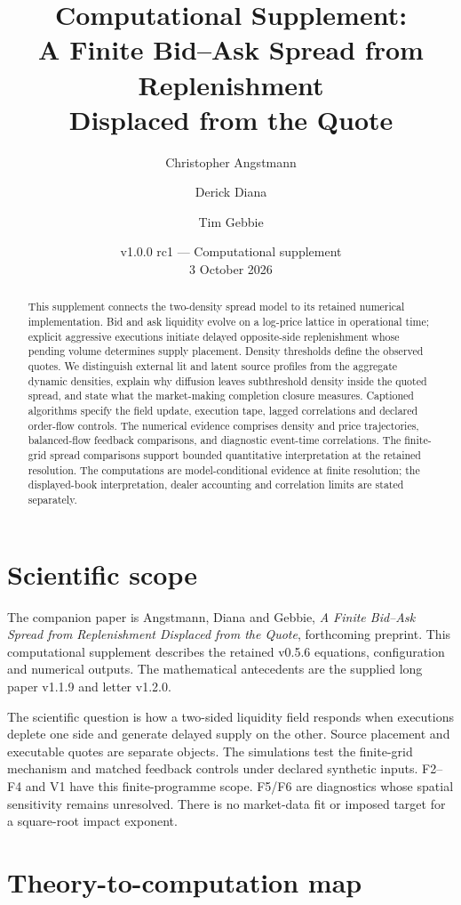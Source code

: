 \documentclass[11pt,a4paper]{article}
\title{Computational Supplement:\\A Finite Bid--Ask Spread from Replenishment\\Displaced from the Quote}
\author{Christopher Angstmann \and Derick Diana \and Tim Gebbie}
\date{v1.0.0 rc1 --- Computational supplement\\3 October 2026}
\begin{document}
\maketitle
\begin{abstract}
This supplement connects the two-density spread model to its retained numerical implementation. Bid and ask liquidity evolve on a log-price lattice in operational time; explicit aggressive executions initiate delayed opposite-side replenishment whose pending volume determines supply placement. Density thresholds define the observed quotes. We distinguish external lit and latent source profiles from the aggregate dynamic densities, explain why diffusion leaves subthreshold density inside the quoted spread, and state what the market-making completion closure measures. Captioned algorithms specify the field update, execution tape, lagged correlations and declared order-flow controls. The numerical evidence comprises density and price trajectories, balanced-flow feedback comparisons, and diagnostic event-time correlations. The finite-grid spread comparisons support bounded quantitative interpretation at the retained resolution. The computations are model-conditional evidence at finite resolution; the displayed-book interpretation, dealer accounting and correlation limits are stated separately.
\end{abstract}
\clearpage
\tableofcontents
\clearpage
\section{Scientific scope}
The companion paper is Angstmann, Diana and Gebbie, \emph{A Finite Bid--Ask Spread from Replenishment Displaced from the Quote}, forthcoming preprint. This computational supplement describes the retained v0.5.6 equations, configuration and numerical outputs. The mathematical antecedents are the supplied long paper v1.1.9 and letter v1.2.0.

The scientific question is how a two-sided liquidity field responds when executions deplete one side and generate delayed supply on the other. Source placement and executable quotes are separate objects. The simulations test the finite-grid mechanism and matched feedback controls under declared synthetic inputs. F2--F4 and V1 have this finite-programme scope. F5/F6 are diagnostics whose spatial sensitivity remains unresolved. There is no market-data fit or imposed target for a square-root impact exponent.

\section{Theory-to-computation map}
\end{document}
